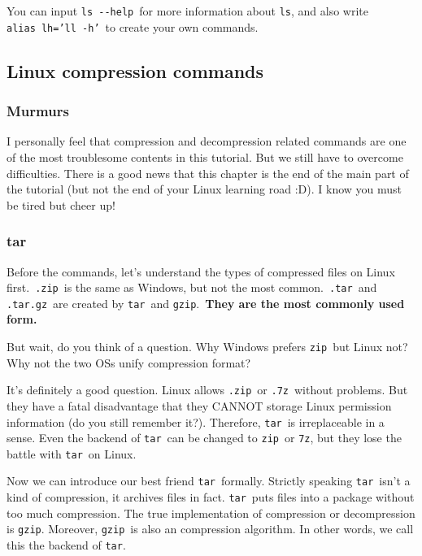 \documentclass[12pt]{ctexart}
\begin{document}
You can input \texttt{ls\ -\/-help}\ for more information about
\texttt{ls}, and also write
\texttt{alias\ lh='ll\ -h'}\ to create
your own commands.

\newpage
\subsection{\textbf{Linux compression commands}}

\subsubsection{\textbf{Murmurs}}

I personally feel that compression and decompression related commands
are one of the most troublesome contents in this tutorial. But we still
have to overcome difficulties. There is a good news that this chapter is
the end of the main part of the tutorial (but not the end of your Linux
learning road :D). I know you must be tired but cheer up!

\subsubsection{\textbf{tar}}

Before the commands, let's understand the types of
compressed files on Linux first.\ \texttt{.zip}\ is the same as Windows,
but not the most common.\ \texttt{.tar}\ and \texttt{.tar.gz}\ are created
by \texttt{tar}\ and \texttt{gzip}.\ \textbf{They are the most commonly
used form.}

But wait, do you think of a question. Why Windows prefers \texttt{zip}\
but Linux not? Why not the two OSs unify compression format?

It's definitely a good question. Linux allows
\texttt{.zip}\ or \texttt{.7z}\ without problems. But they have a fatal
disadvantage that they CANNOT storage Linux permission information (do
you still remember it?). Therefore, \texttt{tar}\ is irreplaceable in a
sense. Even the backend of \texttt{tar}\ can be changed to \texttt{zip}\
or \texttt{7z}, but they lose the battle with \texttt{tar}\ on Linux.

Now we can introduce our best friend \texttt{tar}\ formally. Strictly
speaking \texttt{tar}\ isn't a kind of compression, it
archives files in fact. \texttt{tar}\ puts files into a package without
too much compression. The true implementation of compression or
decompression is \texttt{gzip}. Moreover, \texttt{gzip}\ is also an
compression algorithm. In other words, we call this the backend of
\texttt{tar}.
\end{document}
